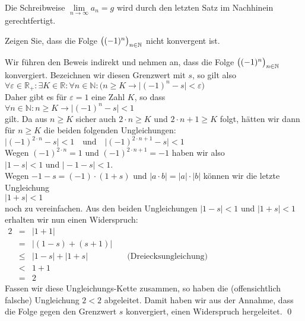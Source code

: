 \remark
Die Schreibweise $\lim\limits_{n\rightarrow\infty} a_n = g$
wird durch den letzten Satz im Nachhinein gerechtfertigt.

\exercise
Zeigen Sie, dass die Folge $\bigl((-1)^n\bigr)_{n\in\mathbb{N}}$ nicht konvergent ist. \eox

\solution
Wir f\"uhren den Beweis indirekt und nehmen an, dass die Folge
$\bigl((-1)^n\bigr)_{n\in\mathbb{N}}$ konvergiert.  Bezeichnen wir diesen Grenzwert mit $s$, so gilt also
\\[0.2cm]
\hspace*{1.3cm}
$\forall \varepsilon \in \mathbb{R}_+: \exists K \in \mathbb{R}: \forall n \in \mathbb{N}: \bigl( n \geq K \rightarrow \bigl|(-1)^n - s\bigr| < \varepsilon\bigr)$
\\[0.2cm]
Daher gibt es f\"ur $\varepsilon = 1$ eine Zahl $K$, so dass 
\\[0.2cm]
\hspace*{1.3cm}
$ \forall n \in \mathbb{N} : n \geq K \rightarrow \bigl|(-1)^n - s\bigr| < 1 $
\\[0.2cm]
gilt.  Da aus $n \geq K$ sicher auch $2 \cdot n \geq K$ und $2\cdot n+1 \geq K$ folgt, h\"atten wir dann
f\"ur $n \geq K$ die beiden folgenden Ungleichungen:
\\[0.2cm]
\hspace*{1.3cm}
$
  \bigl| (-1)^{2\cdot n} - s\bigr| < 1 \quad \mbox{und} \quad
  \bigl| (-1)^{2\cdot n+1} - s\bigr| < 1 
$
\\[0.2cm]
Wegen $(-1)^{2\cdot n} = 1$ und $(-1)^{2\cdot n + 1} = -1$ haben wir also 
\\[0.2cm]
\hspace*{1.3cm}
$\bigl|  1 - s\bigr| < 1$ \quad und \quad $\bigl| -1 - s\bigr| < 1$.
\\[0.2cm]
Wegen $-1 - s = (-1) \cdot (1 + s)$ und $|a \cdot b| = |a|\cdot|b|$ k\"onnen wir die letzte Ungleichung
\\[0.2cm]
\hspace*{1.3cm}
$\bigl| 1 + s\bigr| < 1$
\\[0.2cm]
noch zu  vereinfachen.
Aus den beiden Ungleichungen $|1-s|<1$ und $|1+s|<1$  erhalten wir nun einen Widerspruch:
\\[0.2cm]
\hspace*{1.3cm}
$
\begin{array}{lcll}
  2 & = & \bigl| 1 + 1 \bigr| \\[0.2cm]
    & = & \bigl| (1 - s) + (s + 1) \bigr| \\[0.2cm]
    & \leq & \bigl|1 - s\bigr| + \bigl|1+s \bigr| & \quad \mbox{(Dreiecksungleichung)} \\[0.2cm]
    & <    & 1 + 1                         \\[0.2cm]
    & =    & 2 & 
\end{array}
$
\\[0.2cm]
Fassen wir diese Ungleichungs-Kette zusammen, so haben die (offensichtlich falsche)
Ungleichung $2<2$ abgeleitet.
Damit haben wir aus der Annahme, dass die Folge gegen den Grenzwert $s$ konvergiert, einen
Widerspruch hergeleitet. \qed
\pagebreak

